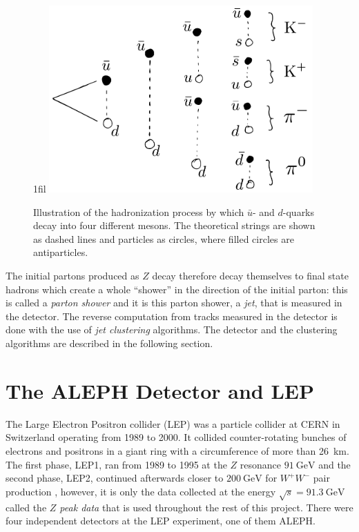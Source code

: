\documentclass[a4paper, twoside, nobib]{tufte-book}
\makeatletter
\newcommand*{\centerfloat}{%
  \parindent \z@
  \leftskip \z@ \@plus 1fil \@minus \textwidth
  \rightskip\leftskip
  \parfillskip \z@skip}
\newcommand{\q}[1]{``#1''}
\newcommand{\autocite}[1]{\citep{#1}}
\makeatother
\begin{document}
\begin{figure}
  \centerfloat
  \includegraphics[width=0.9\textwidth]{figures/hadronization/hadronization.pdf}
  \caption[Hadronization process]{Illustration of the hadronization process by which $\bar{u}$- and $d$-quarks decay into four different mesons. The theoretical strings are shown as dashed lines and particles as circles, where filled circles are antiparticles.}
  \label{fig:hep:hadronization}
\end{figure}

The initial partons produced as $Z$ decay therefore decay themselves to final state hadrons which create a whole \q{shower} in the direction of the initial parton: this is called a \emph{parton shower} and it is this parton shower, a \emph{jet}, that is measured in the detector. The reverse computation from tracks measured in the detector is done with the use of \emph{jet clustering} algorithms. The detector and the clustering algorithms are described in the following section.


\FloatBarrier
\section{The ALEPH Detector and LEP}
\label{sec:hep:aleph}

The Large Electron Positron collider (LEP) was a particle collider at CERN in Switzerland operating from \num{1989} to \num{2000}. It collided counter-rotating bunches of electrons and positrons in a giant ring with a circumference of more than \SI{26}{\km}. The first phase, LEP1, ran from \num{1989} to \num{1995} at the $Z$ resonance $\SI{91}{\GeV}$ and the second phase, LEP2, continued afterwards closer to $\SI{200}{\GeV}$ for $W^+W^-$ pair production \autocite{Armstrong1998hy}, however, it is only the data collected at the energy $\sqrt{s} = \SI{91.3}{\GeV}$ called the \emph{$Z$ peak data} that is used throughout the rest of this project. There were four independent detectors at the LEP experiment, one of them ALEPH.
\end{document}
